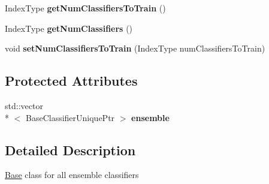 \begin{DoxyCompactItemize}
\item 
\hypertarget{classffactory_1_1_base_ensemble_classifier_afd0663c86f1f0313bdac18cb93d07030}{Index\-Type {\bfseries get\-Num\-Classifiers\-To\-Train} ()}\label{classffactory_1_1_base_ensemble_classifier_afd0663c86f1f0313bdac18cb93d07030}

\item 
\hypertarget{classffactory_1_1_base_ensemble_classifier_a5f35f1379fa4e849ce5e5be7fb8ac0b7}{Index\-Type {\bfseries get\-Num\-Classifiers} ()}\label{classffactory_1_1_base_ensemble_classifier_a5f35f1379fa4e849ce5e5be7fb8ac0b7}

\item 
\hypertarget{classffactory_1_1_base_ensemble_classifier_a8523f3c50cb72816f0ac23bd2c1f6365}{void {\bfseries set\-Num\-Classifiers\-To\-Train} (Index\-Type num\-Classifiers\-To\-Train)}\label{classffactory_1_1_base_ensemble_classifier_a8523f3c50cb72816f0ac23bd2c1f6365}

\end{DoxyCompactItemize}
\subsection*{Protected Attributes}
\begin{DoxyCompactItemize}
\item 
\hypertarget{classffactory_1_1_base_ensemble_classifier_a8215e2bc0eefca0076058fc54b5c211c}{std\-::vector\\*
$<$ Base\-Classifier\-Unique\-Ptr $>$ {\bfseries ensemble}}\label{classffactory_1_1_base_ensemble_classifier_a8215e2bc0eefca0076058fc54b5c211c}

\end{DoxyCompactItemize}


\subsection{Detailed Description}
\hyperlink{classffactory_1_1_base}{Base} class for all ensemble classifiers 

